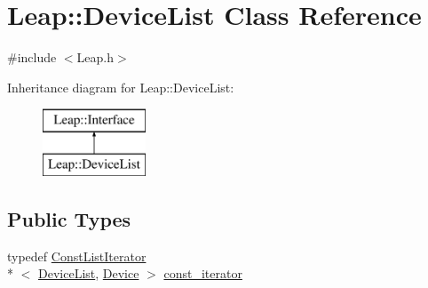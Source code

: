 \hypertarget{class_leap_1_1_device_list}{\section{Leap\+:\+:Device\+List Class Reference}
\label{class_leap_1_1_device_list}
}


{\ttfamily \#include $<$Leap.\+h$>$}

Inheritance diagram for Leap\+:\+:Device\+List\+:\begin{figure}[H]
\begin{center}
\leavevmode
\includegraphics[height=2.000000cm]{class_leap_1_1_device_list}
\end{center}
\end{figure}
\subsection*{Public Types}
\begin{DoxyCompactItemize}
\item 
typedef \hyperlink{class_leap_1_1_const_list_iterator}{Const\+List\+Iterator}\\*
$<$ \hyperlink{class_leap_1_1_device_list}{Device\+List}, \hyperlink{class_leap_1_1_device}{Device} $>$ \hyperlink{class_leap_1_1_device_list_acfe5b07cda502759bf8fe768e8c6ba87}{const\+\_\+iterator}
\end{DoxyCompactItemize}
